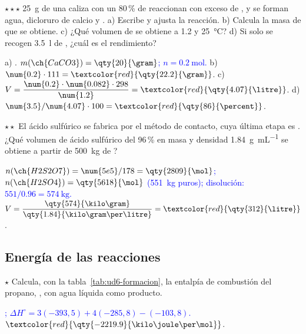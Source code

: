 \begin{exercise}
    \(\star\star\star\) \qty{25}{\gram} de una caliza con un 80\,\% de  reaccionan con exceso de , y se forman
    agua, dicloruro de calcio y . a) Escribe y ajusta la reacción. b) Calcula la masa de  que se obtiene. c) ¿Qué
    volumen de  se obtiene a \qty{1.2}{\atm} y \qty{25}{\degreeCelsius}? d) Si solo se recogen \qty{3.5}{\litre} de ,
    ¿cuál es el rendimiento?
    \begin{solu}
        a) \textcolor{red}{}. \textcolor{blue}{\(m(\ch{CaCO3}) = \qty{20}{\gram}\); \(n = \qty{0.2}{\mol}\).}
        b) \(\num{0.2} \cdot 111 = \textcolor{red}{\qty{22.2}{\gram}}\). c) \(V = \dfrac{\num{0.2} \cdot \num{0.082} \cdot 298}{\num{1.2}} =
        \textcolor{red}{\qty{4.07}{\litre}}\). d) \(\num{3.5}/\num{4.07} \cdot 100 = \textcolor{red}{\qty{86}{\percent}}\).
    \end{solu}
\end{exercise}

\begin{exercise}
    \(\star\star\) El ácido sulfúrico se fabrica por el método de contacto, cuya última etapa es
    . ¿Qué volumen de ácido sulfúrico del 96\,\% en masa y densidad \qty{1.84}{\gram\per\mL} se
    obtiene a partir de \qty{500}{\kilo\gram} de ?
    \begin{solu}
        \textcolor{blue}{\(n(\ch{H2S2O7}) = \num{5e5}/178 = \qty{2809}{\mol}\); \(n(\ch{H2SO4}) = \qty{5618}{\mol}\) (\qty{551}{\kilo\gram}
        puros); disolución: \(551/\num{0.96} = \qty{574}{\kilo\gram}\).} \(V = \dfrac{\qty{574}{\kilo\gram}}{\qty{1.84}{\kilo\gram\per\litre}} =
        \textcolor{red}{\qty{312}{\litre}}\).
    \end{solu}
\end{exercise}

\subsection{Energía de las reacciones}

\begin{exercise}
    \(\star\) Calcula, con la tabla~\ref{tab:ud6-formacion}, la entalpía de combustión del propano, , con agua líquida
    como producto.
    \begin{solu}
        \textcolor{blue}{; \(\Delta H^\circ = 3(-393{,}5) + 4(-285{,}8) - (-103{,}8)\).}
        \(\textcolor{red}{\qty{-2219.9}{\kilo\joule\per\mol}}\).
    \end{solu}
\end{exercise}

